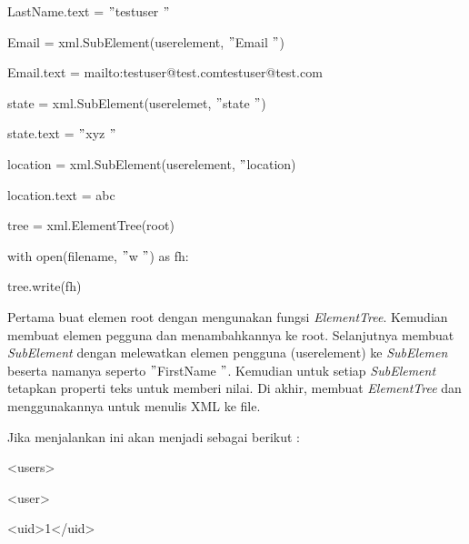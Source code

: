 \noindent 
{\fontsize{10pt}{10pt}\selectfont LastName.text =  $ " $testuser $ " $} \par
\vspace{10pt}
\noindent 
{\fontsize{10pt}{10pt}\selectfont Email = xml.SubElement(userelement,  $ " $Email $ " $)} \par
\noindent 
{\fontsize{10pt}{10pt}\selectfont Email.text = {mailto:testuser@test.com}{testuser@test.com}
} \par
\vspace{10pt}
\noindent 
{\fontsize{10pt}{10pt}\selectfont state = xml.SubElement(userelemet,  $ " $state $ " $)} \par
\noindent 
{\fontsize{10pt}{10pt}\selectfont state.text =  $ " $xyz $ " $} \par
\vspace{10pt}
\noindent 
{\fontsize{10pt}{10pt}\selectfont location = xml.SubElement(userelement,  $ " $location)} \par
\noindent 
{\fontsize{10pt}{10pt}\selectfont location.text = abc} \par
\vspace{10pt}
\noindent 
{\fontsize{10pt}{10pt}\selectfont tree = xml.ElementTree(root)} \par
\noindent 
{\fontsize{10pt}{10pt}\selectfont with open(filename,  $ " $w $ " $) as fh:} \par
\noindent 
{\fontsize{10pt}{10pt}\selectfont tree.write(fh)} \par
\vspace{10pt}
\noindent 
 \hspace*{0.5in} Pertama buat elemen root dengan mengunakan fungsi \textit{ElementTree}. Kemudian membuat elemen pegguna dan menambahkannya ke root. Selanjutnya membuat \textit{SubElement }dengan melewatkan elemen pengguna (userelement) ke \textit{SubElemen} beserta namanya seperto  $ " $FirstName $ " $. Kemudian untuk setiap \textit{SubElement} tetapkan properti teks untuk memberi nilai. Di akhir, membuat \textit{ElementTree} dan menggunakannya untuk menulis XML ke file. \par
\noindent 
 \hspace*{0.5in} Jika menjalankan ini akan menjadi sebagai berikut : \par
\noindent 
 {\fontsize{10pt}{10pt}\selectfont <users>} \par
\noindent 
{\fontsize{10pt}{10pt}\selectfont  \hspace*{0.5in} <user>} \par
\noindent 
{\fontsize{10pt}{10pt}\selectfont  \hspace*{0.5in}  \hspace*{0.5in} <uid>1</uid>} \par
